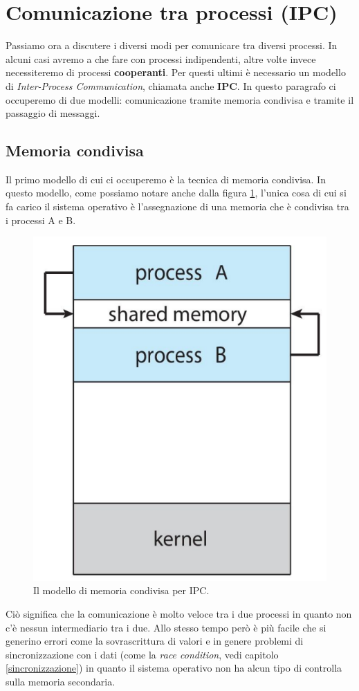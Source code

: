 % 
\section{Comunicazione tra processi (IPC)}\label{IPC}
Passiamo ora a discutere i diversi modi per comunicare tra diversi processi. In alcuni casi avremo a che fare con processi indipendenti, altre volte invece necessiteremo di processi \textbf{cooperanti}. Per questi ultimi è necessario un modello di \textit{Inter-Process Communication}, chiamata anche \textbf{IPC}. In questo paragrafo ci occuperemo di due modelli: comunicazione tramite memoria condivisa e tramite il passaggio di messaggi.

% 
\subsection{Memoria condivisa}
Il primo modello di cui ci occuperemo è la tecnica di memoria condivisa. In questo modello, come possiamo notare anche dalla figura \ref{fig:shared_memory}, l'unica cosa di cui si fa carico il sistema operativo è l'assegnazione di una memoria che è condivisa tra i processi A e B.
\begin{figure}[h]
    \centering
    \includegraphics[width = .25\textwidth]{../res/imgs/processes/shared_memory.png}
    \caption{Il modello di memoria condivisa per IPC.}
    \label{fig:shared_memory}
\end{figure}
Ciò significa che la comunicazione è molto veloce tra i due processi in quanto non c'è nessun intermediario tra i due. Allo stesso tempo però è più facile che si generino errori come la sovrascrittura di valori e in genere problemi di sincronizzazione con i dati (come la \textit{race condition}, vedi capitolo \ref{sincronizzazione}) in quanto il sistema operativo non ha alcun tipo di controlla sulla memoria secondaria.

